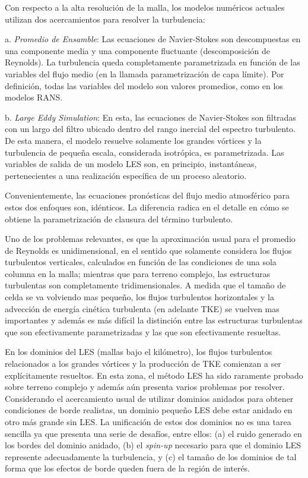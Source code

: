 Con respecto a la alta resolución de la malla, los modelos numéricos actuales utilizan dos acercamientos para resolver la turbulencia:
\begin{enumerate*}
	\item[a.] \emph{Promedio de Ensamble}: Las ecuaciones de Navier-Stokes son descompuestas en una componente media y una componente fluctuante (descomposición de Reynolds). La turbulencia queda completamente parametrizada en función de las variables del flujo medio (en la llamada parametrización de capa límite). Por definición, todas las variables del modelo son valores promedios, como en los modelos RANS.
	\item[b.] \emph{Large Eddy Simulation}: En esta, las ecuaciones de Navier-Stokes son filtradas con un largo del filtro ubicado dentro del rango inercial del espectro turbulento. De esta manera, el modelo resuelve solamente los grandes vórtices y la turbulencia de pequeña escala, considerada isotrópica, es parametrizada. Las variables de salida de un modelo LES son, en principio, instantáneas, pertenecientes a una realización específica de un proceso aleatorio.
\end{enumerate*} 

Convenientemente, las ecuaciones pronósticas del flujo medio atmosférico para estos dos enfoques son, idénticos. La diferencia radica en el detalle en cómo se obtiene la parametrización de clausura del término turbulento.

Uno de los problemas relevantes, es que la aproximación usual para el promedio de Reynolds es unidimensional, en el sentido que solamente considera los flujos turbulentos verticales, calculados en función de las condiciones de una sola columna en la malla; mientras que para terreno complejo, las estructuras turbulentas son completamente tridimensionales. A medida que el tamaño de celda se va volviendo mas pequeño, los flujos turbulentos horizontales y la advección de energía cinética turbulenta (en adelante TKE) se vuelven mas importantes y además es más difícil la distinción entre las estructuras turbulentas que son efectivamente parametrizadas y las que son efectivamente resueltas. 

En los dominios del LES (mallas bajo el kilómetro), los flujos turbulentos relacionados a los grandes vórtices y la producción de TKE comienzan a ser explícitamente resueltos. En esta zona, el método LES ha sido raramente probado sobre terreno complejo y además aún presenta varios problemas por resolver. Considerando el acercamiento usual de utilizar dominios anidados para obtener condiciones de borde realistas, un dominio pequeño LES debe estar anidado en otro más grande sin LES. La unificación de estos dos dominios no es una tarea sencilla ya que presenta una serie de desafíos, entre ellos: (a) el ruido generado en los bordes del dominio anidado, (b) el \emph{spin-up} necesario para que el dominio LES represente adecuadamente la turbulencia, y (c) el tamaño de los dominios de tal forma que los efectos de borde queden fuera de la región de interés.

